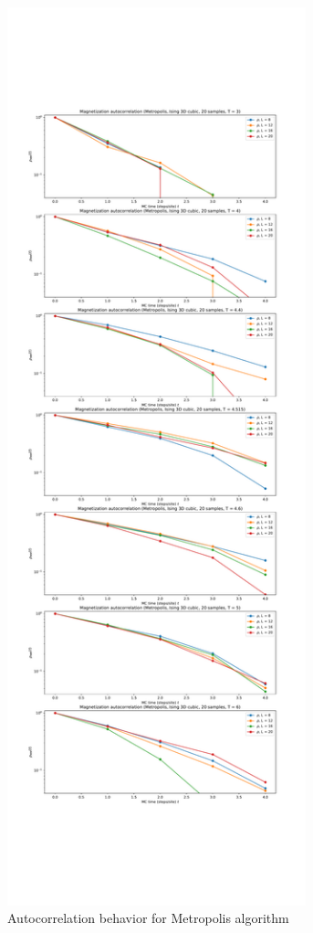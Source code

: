 \documentclass[11pt,a4paper]{article}
\begin{document}
\begin{figure}[b]
	\centering
	\includegraphics[height=26cm]{autocorr_Metropolis.pdf}
	\caption[short]{Autocorrelation behavior for Metropolis algorithm}
	\label{fig:4}
\end{figure}
\end{document}
